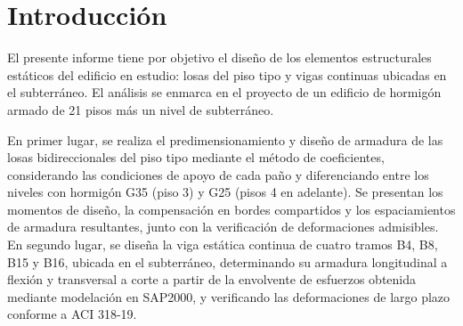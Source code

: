 \section{Introducción}

El presente informe tiene por objetivo el diseño de los elementos estructurales estáticos del edificio en estudio: losas del piso tipo y vigas continuas ubicadas en el subterráneo. El análisis se enmarca en el proyecto de un edificio de hormigón armado de 21 pisos más un nivel de subterráneo.

En primer lugar, se realiza el predimensionamiento y diseño de armadura de las losas bidireccionales del piso tipo mediante el método de coeficientes, considerando las condiciones de apoyo de cada paño y diferenciando entre los niveles con hormigón G35 (piso 3) y G25 (pisos 4 en adelante). Se presentan los momentos de diseño, la compensación en bordes compartidos y los espaciamientos de armadura resultantes, junto con la verificación de deformaciones admisibles. En segundo lugar, se diseña la viga estática continua de cuatro tramos B4, B8, B15 y B16, ubicada en el subterráneo, determinando su armadura longitudinal a flexión y transversal a corte a partir de la envolvente de esfuerzos obtenida mediante modelación en SAP2000, y verificando las deformaciones de largo plazo conforme a ACI 318-19.
